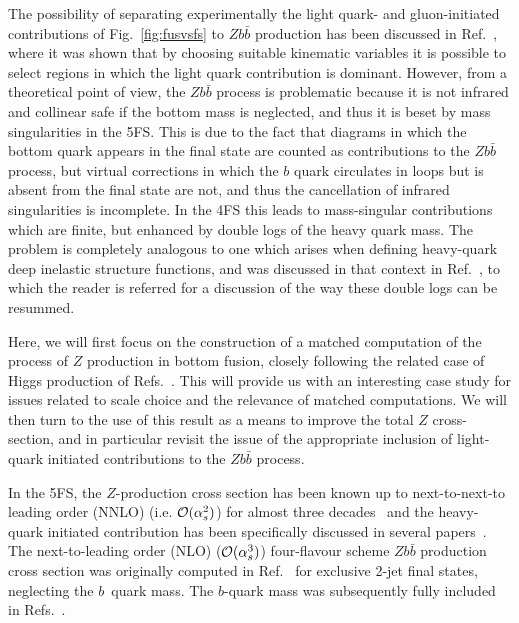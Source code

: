 \documentclass[12pt]{article}
\newcommand{\order}[1]{{\cal O}(#1)}
\begin{document}
The possibility of
separating experimentally the light quark- and gluon-initiated
contributions of Fig.~\ref{fig:fusvsfs} to $Zb\bar b$ production
has been discussed in
Ref.~\cite{Chatrchyan:2013zja}, where it was shown that by choosing
suitable kinematic variables it is possible to select regions in
which the light quark contribution is dominant. However, from a theoretical
point of view, the  $Zb\bar b$ process is problematic because it is not
infrared and collinear safe if the bottom mass is neglected, and thus
it is beset by mass singularities in the 5FS. This is due to the fact
that diagrams in which the bottom quark appears in the final state are
counted as contributions to the  $Zb\bar b$ process, but virtual corrections in
which the $b$ quark circulates in loops but is absent from  the final state
are not, and thus the cancellation of infrared singularities is
incomplete. In the 4FS this leads to mass-singular contributions
which are finite, but enhanced by double logs of the heavy quark
mass. The problem is completely analogous to one which arises when
defining heavy-quark deep inelastic structure functions, and was
discussed in that context in Ref.~\cite{Forte:2010ta}, to which the
reader is referred for a discussion of the way these double logs can
be resummed. 

Here, we will first focus on the construction of a matched computation
of the process of $Z$ production in bottom fusion, closely following
the related case of Higgs production of
Refs.~\cite{Forte:2015hba,Forte:2016sja}. This will provide us with an
interesting case study for issues related to scale choice and the
relevance of matched computations. 
We will then turn to the use of this result as a means to improve the
total $Z$ cross-section, and in particular revisit the issue of the
appropriate inclusion of light-quark initiated contributions to the
$Zb\bar b$ process.

In the 5FS, the $Z$-production cross section has been known up to
next-to-next-to leading order
(NNLO) (i.e. $\order{\alpha_s^2}$) for almost three decades~\cite{Hamberg:1990np} and 
the heavy-quark initiated contribution has been specifically discussed
in 
several papers~\cite{Rijken:1995gi,Stelzer:1997ns,Maltoni:2005wd}.
%
The next-to-leading order (NLO) ($\order{\alpha_s^3}$) four-flavour scheme
$Zb\bar{b}$ production cross section was originally computed 
in Ref.~\cite{Campbell:2000bg} 
for exclusive 2-jet final states, neglecting the $b$~quark mass. 
The $b$-quark mass was subsequently fully included in
Refs.~\cite{FebresCordero:2008ci,Cordero:2009kv}.
\end{document}
